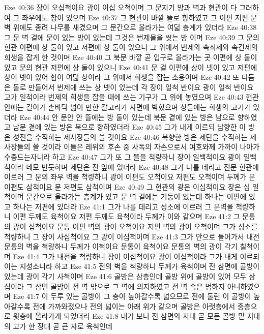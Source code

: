 Eze 40:36  장이 오십척이요 광이 이십 오척이며 그 문지기 방과 벽과 현관이 다 그러하여 그 좌우에도 창이 있으며
Eze 40:37  그 현관이 바깥 뜰로 향하였고 그 이편 저편 문 벽 위에도 종려 나무를 새겼으며 그 문간으로 올라가는 여덟 층계가 있더라
Eze 40:38  그 문 벽 곁에 문이 있는 방이 있는데 그것은 번제물을 씻는 방 이며
Eze 40:39  그 문의 현관 이편에 상 둘이 있고 저편에 상 둘이 있으니 그 위에서 번제와 속죄제와 속건제의 희생을 잡게 한 것이며
Eze 40:40  그 북문 바깥 곧 입구로 올라가는 곳 이편에 상 둘이 있고 문의 현관 저편에 상 둘이 있으니
Eze 40:41  문 곁 이편에 상이 넷이 있고 저편에 상이 넷이 있어 합이 여덟 상이라 그 위에서 희생을 잡는 소용이며
Eze 40:42  또 다듬은 돌로 만들어서 번제에 쓰는 상 넷이 있는데 각 장이 일척 반이요 광이 일척 반이요 고가 일척이라 번제의 희생을 잡을 때에 쓰는 기구가 그 위에 놓였으며
Eze 40:43  현관 안에는 길이가 손바닥 넒이 만한 갈고리가 사면에 박혔으며 상들에는 희생의 고기가 있더라
Eze 40:44  안 문안 안 뜰에는 방 둘이 있는데 북문 곁에 있는 방은 남으로 향하였고 남문 곁에 있는 방은 북으로 향하였더라
Eze 40:45  그가 내게 이르되 남향한 이 방은 성전을 수직하는 제사장들의 쓸 것이요
Eze 40:46  북향한 방은 제단을 수직하는 제사장들의 쓸 것이라 이들은 레위의 후손 중 사독의 자손으로서 여호와께 가까이 나아가 수종드는자니라 하고
Eze 40:47  그가 또 그 뜰을 척량하니 장이 일백척이요 광이 일백척이라 네모 반듯하며 제단은 전 앞에 있더라
Eze 40:48  그가 나를 데리고 전문 현관에 이르러 그 문의 좌우 벽을 척량하니 광이 이편도 오척이요 저편도 오척이며 두께가 문 이편도 삼척이요 문 저편도 삼척이며
Eze 40:49  그 현관의 광은 이십척이요 장은 십 일척이며 문간으로 올라가는 층계가 있고 문 벽 곁에는 기둥이 있는데 하나는 이편에 있고 하나는 저편에 있더라
Eze 41:1  그가 나를 데리고 성소에 이르러 그 문벽을 척량하니 이편 두께도 육척이요 저편 두께도 육척이라 두께가 이와 같으며
Eze 41:2  그 문통의 광이 십척이요 문통 이편 벽의 광이 오척이요 저편 벽의 광이 오척이며 그가 성소를 척량하니 그 장이 사십척이요 그 광이 이십척이며
Eze 41:3  그가 안으로 들어가서 내전 문통의 벽을 척량하니 두께가 이척이요 문통이 육척이요 문통의 벽의 광이 각기 칠척이며
Eze 41:4  그가 내전을 척량하니 장이 이십척이요 광이 이십척이라 그가 내게 이르되 이는 지성소니라 하고
Eze 41:5  전의 벽을 척량하니 두께가 육척이며 전 삼면에 골방이 있는데 광이 각기 사척이며
Eze 41:6  골방은 삼층인데 골방 위에 골방이 있어 모두 삼십이라 그 삼면 골방이 전 벽 밖으로 그 벽에 의지하였고 전 벽 속은 범하지 아니하였으며
Eze 41:7  이 두루 있는 골방이 그 층이 높아갈수록 넓으므로 전에 둘린 이 골방이 높아갈수록 전에 가까와졌으나 전의 넓이는 아래 위가 같으며 골방은 아랫층에서 중층으로 윗층에 올라가게 되었더라
Eze 41:8  내가 보니 전 삼면의 지대 곧 모든 골방 밑 지대의 고가 한 장대 곧 큰 자로 육척인데
